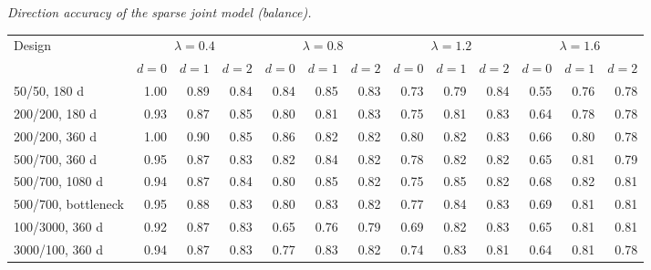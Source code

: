 \noindent\textit{Direction accuracy of the sparse joint model (balance).}
\begin{center}
\footnotesize
\setlength{\tabcolsep}{3pt}
\begin{tabular}{l*{12}{r}}
\toprule
Design & \multicolumn{3}{c}{$\lambda=0.4$} & \multicolumn{3}{c}{$\lambda=0.8$} & \multicolumn{3}{c}{$\lambda=1.2$} & \multicolumn{3}{c}{$\lambda=1.6$} \\
\cmidrule(lr){2-4}\cmidrule(lr){5-7}\cmidrule(lr){8-10}\cmidrule(lr){11-13}
 & $d=0$ & $d=1$ & $d=2$ & $d=0$ & $d=1$ & $d=2$ & $d=0$ & $d=1$ & $d=2$ & $d=0$ & $d=1$ & $d=2$ \\
\midrule
50/50, 180 d & 1.00 & 0.89 & 0.84 & 0.84 & 0.85 & 0.83 & 0.73 & 0.79 & 0.84 & 0.55 & 0.76 & 0.78 \\
200/200, 180 d & 0.93 & 0.87 & 0.85 & 0.80 & 0.81 & 0.83 & 0.75 & 0.81 & 0.83 & 0.64 & 0.78 & 0.78 \\
200/200, 360 d & 1.00 & 0.90 & 0.85 & 0.86 & 0.82 & 0.82 & 0.80 & 0.82 & 0.83 & 0.66 & 0.80 & 0.78 \\
500/700, 360 d & 0.95 & 0.87 & 0.83 & 0.82 & 0.84 & 0.82 & 0.78 & 0.82 & 0.82 & 0.65 & 0.81 & 0.79 \\
500/700, 1080 d & 0.94 & 0.87 & 0.84 & 0.80 & 0.85 & 0.82 & 0.75 & 0.85 & 0.82 & 0.68 & 0.82 & 0.81 \\
500/700, bottleneck & 0.95 & 0.88 & 0.83 & 0.80 & 0.83 & 0.82 & 0.77 & 0.84 & 0.83 & 0.69 & 0.81 & 0.81 \\
100/3000, 360 d & 0.92 & 0.87 & 0.83 & 0.65 & 0.76 & 0.79 & 0.69 & 0.82 & 0.83 & 0.65 & 0.81 & 0.81 \\
3000/100, 360 d & 0.94 & 0.87 & 0.83 & 0.77 & 0.83 & 0.82 & 0.74 & 0.83 & 0.81 & 0.64 & 0.81 & 0.78 \\
\bottomrule
\end{tabular}
\end{center}
